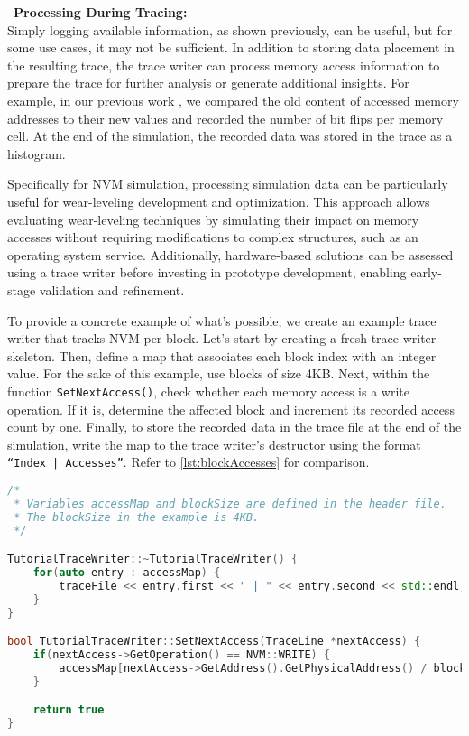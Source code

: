 ~\noindent \textbf{Processing During Tracing:}\\
Simply logging available information, as shown previously, can be useful, but for some use cases, it may not be sufficient. In addition to storing data placement in the resulting trace, the trace writer can process memory access information to prepare the trace for further analysis or generate additional insights.
For example, in our previous work \cite{hoelscher:2023}, we compared the old content of accessed memory addresses to their new values and recorded the number of bit flips per memory cell. At the end of the simulation, the recorded data was stored in the trace as a histogram.

Specifically for NVM simulation, processing simulation data can be particularly useful for wear-leveling development and optimization. This approach allows evaluating wear-leveling techniques by simulating their impact on memory accesses without requiring modifications to complex structures, such as an operating system service. Additionally, hardware-based solutions can be assessed using a trace writer before investing in prototype development, enabling early-stage validation and refinement.

To provide a concrete example of what’s possible, we create an example trace writer that tracks NVM  per block.
Let's start by creating a fresh trace writer skeleton. Then, define a map that associates each block index with an integer value. For the sake of this example, use blocks of size 4KB. Next, within the function \texttt{SetNextAccess()}, check whether each memory access is a write operation. If it is, determine the affected block and increment its recorded access count by one.
Finally, to store the recorded data in the trace file at the end of the simulation, write the map to the trace writer’s destructor using the format \texttt{“Index | Accesses”}. Refer to \cref{lst:blockAccesses} for comparison.


\begin{lstlisting}[caption={Trace Block Accesses},label=lst:blockAccesses,language=c++,basicstyle=\ttfamily\scriptsize]
/*
 * Variables accessMap and blockSize are defined in the header file.
 * The blockSize in the example is 4KB.
 */

TutorialTraceWriter::~TutorialTraceWriter() {
    for(auto entry : accessMap) {
        traceFile << entry.first << " | " << entry.second << std::endl;
    }
}

bool TutorialTraceWriter::SetNextAccess(TraceLine *nextAccess) {
    if(nextAccess->GetOperation() == NVM::WRITE) {
        accessMap[nextAccess->GetAddress().GetPhysicalAddress() / blockSize]++;
    }

    return true
}
\end{lstlisting}


